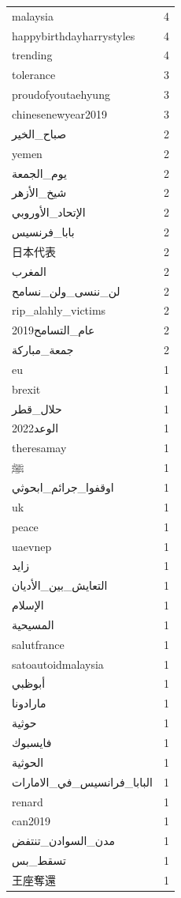 \begin{tabular}{lr}
malaysia & 4 \\
happybirthdayharrystyles & 4 \\
trending & 4 \\
tolerance & 3 \\
proudofyoutaehyung & 3 \\
chinesenewyear2019 & 3 \\
صباح\_الخير & 2 \\
yemen & 2 \\
يوم\_الجمعة & 2 \\
شيخ\_الأزهر & 2 \\
الإتحاد\_الأوروبي & 2 \\
بابا\_فرنسيس & 2 \\
日本代表 & 2 \\
المغرب & 2 \\
لن\_ننسى\_ولن\_نسامح & 2 \\
rip\_alahly\_victims & 2 \\
عام\_التسامح2019 & 2 \\
جمعة\_مباركة & 2 \\
eu & 1 \\
brexit & 1 \\
حلال\_قطر & 1 \\
الوعد2022 & 1 \\
theresamay & 1 \\
ﷺ & 1 \\
اوقفوا\_جرائم\_ابحوثي & 1 \\
uk & 1 \\
peace & 1 \\
uaevnep & 1 \\
زايد & 1 \\
التعايش\_بين\_الأديان & 1 \\
الإسلام & 1 \\
المسيحية & 1 \\
salutfrance & 1 \\
satoautoidmalaysia & 1 \\
أبوظبي & 1 \\
مارادونا & 1 \\
حوثية & 1 \\
فايسبوك & 1 \\
الحوثية & 1 \\
البابا\_فرانسيس\_في\_الامارات & 1 \\
renard & 1 \\
can2019 & 1 \\
مدن\_السوادن\_تنتفض & 1 \\
تسقط\_بس️ & 1 \\
王座奪還 & 1 \\

\end{tabular}
